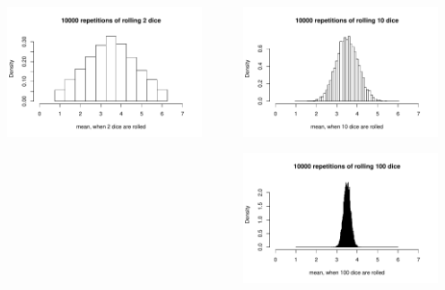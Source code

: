 \begin{frame}
\begin{columns}
\begin{column}{0.5\textwidth}
\begin{center}
\includegraphics[width=0.9\textwidth]{4-1_var_in_est/figures/six_sided_dice/rolls_by_2.pdf}
\end{center}
\end{column}
\begin{column}{0.5\textwidth}
\begin{center}
\includegraphics[width=0.9\textwidth]{4-1_var_in_est/figures/six_sided_dice/rolls_by_10.pdf}

\includegraphics[width=0.9\textwidth]{4-1_var_in_est/figures/six_sided_dice/rolls_by_100.pdf}
\end{center}
\end{column}
\end{columns}
\end{frame}



